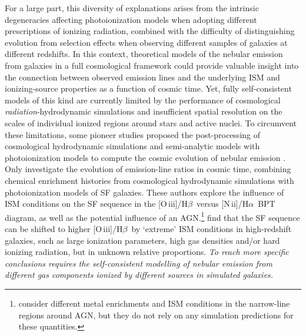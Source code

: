 \documentclass[fleqn,usenatbib]{mnras}
\newcommand{\oiiihb}{\hbox{[O\,{\sc iii}]/H$\beta$}}
\newcommand{\niiha}{\hbox{[N\,{\sc ii}]/H$\alpha$}}
\begin{document}
For a large part, this diversity of explanations arises from the
intrinsic degeneracies affecting photoionization models when adopting
different prescriptions of ionizing radiation, combined with the
difficulty of distinguishing evolution from selection effects when
observing different samples of galaxies at different redshifts. In
this context, theoretical models of the nebular emission from galaxies
in a full cosmological framework could provide valuable insight into
the connection between observed emission  lines and the underlying ISM
and ionizing-source properties as a function of cosmic time. Yet,
fully self-consistent models of this kind are currently limited by the
performance of  cosmological {\it radiation}-hydrodynamic simulations
and insufficient spatial resolution on the scales of individual
ionized regions around stars and active nuclei. To circumvent these
limitations, some pioneer studies proposed the post-processing of
cosmological hydrodynamic  simulations and semi-analytic models with
photoionization models to compute the cosmic  evolution of nebular
emission \citep{Kewley13,  Orsi14,Shimizu16}. Only \citet{Kewley13}
investigate the evolution of emission-line ratios in cosmic time,
combining chemical enrichment  histories from cosmological
hydrodynamic simulations with photoionization models  of SF
galaxies. These authors explore the influence of ISM conditions on the
SF sequence  in the \oiiihb\ versus \niiha\ BPT diagram, as well as
the potential influence of an  AGN.\footnote{\citet{Kewley13} consider
  different metal enrichments and ISM conditions  in the narrow-line
  regions around AGN, but they do not rely on any simulation
  predictions for these  quantities.} \citet{Kewley13} find that the
SF sequence can be shifted to higher \oiiihb\ by  `extreme' ISM
conditions in high-redshift galaxies, such as large ionization
parameters,  high gas densities and/or hard ionizing radiation, but in
unknown relative proportions. {\em To reach more specific conclusions
  requires the self-consistent modelling of nebular emission from
  different gas components ionized by different sources in simulated
  galaxies.} 
\end{document}
